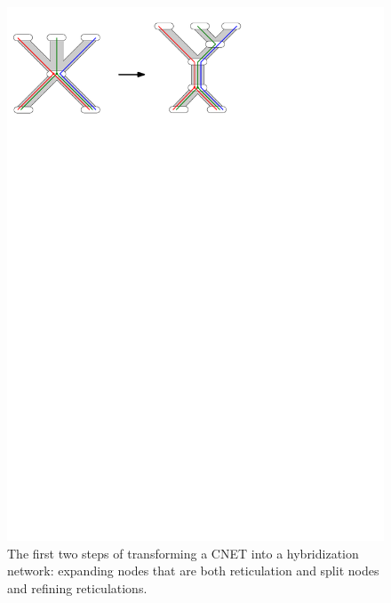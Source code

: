 \begin{figure}[h]
	\centering
		\includegraphics{../figs/ch4/node-splitting2.pdf}
	\caption{The first two steps of transforming a CNET into a hybridization network: expanding nodes that are both reticulation and split nodes and refining reticulations.}
	\label{fig:nodesplit}
\end{figure}

